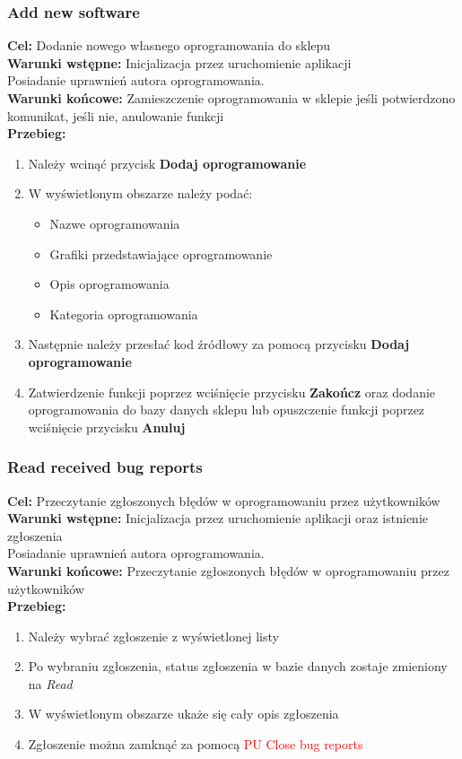 \documentclass[12pt,a4paper]{article}
\begin{document}
\subsubsection{Add new software}
\textbf{Cel: } Dodanie nowego własnego oprogramowania do sklepu \\
\textbf{Warunki wstępne:} Inicjalizacja przez uruchomienie aplikacji \\ Posiadanie uprawnień autora oprogramowania.\\
\textbf{Warunki końcowe:} Zamieszczenie oprogramowania w sklepie jeśli potwierdzono komunikat, jeśli nie, anulowanie funkcji\\
\textbf{Przebieg:}
\begin{enumerate}
    \item Należy wcinąć przycisk \textbf{Dodaj oprogramowanie}
    \item W wyświetlonym obszarze należy podać:
    \begin{itemize}
        \item Nazwe oprogramowania
        \item Grafiki przedstawiające oprogramowanie
        \item Opis oprogramowania
        \item Kategoria oprogramowania
    \end{itemize}
    \item Następnie należy przesłać kod źródłowy za pomocą przycisku  \textbf{Dodaj oprogramowanie}
    \item Zatwierdzenie funkcji poprzez wciśnięcie przycisku \textbf{Zakończ} oraz dodanie oprogramowania do bazy danych sklepu lub opuszczenie funkcji poprzez wciśnięcie przycisku \textbf{Anuluj}
\end{enumerate}

\subsubsection{Read received bug reports}
\textbf{Cel: } Przeczytanie zgłoszonych błędów w oprogramowaniu przez użytkowników \\
\textbf{Warunki wstępne:} Inicjalizacja przez uruchomienie aplikacji oraz istnienie zgłoszenia\\ Posiadanie uprawnień autora oprogramowania.\\
\textbf{Warunki końcowe:} Przeczytanie zgłoszonych błędów w oprogramowaniu przez użytkowników\\
\textbf{Przebieg:}
\begin{enumerate}
    \item Należy wybrać zgłoszenie z wyświetlonej listy
    \item Po wybraniu zgłoszenia, status zgłoszenia w bazie danych zostaje zmieniony na \textit{Read} 
    \item W wyświetlonym obszarze ukaże się cały opis zgłoszenia
    \item Zgłoszenie można zamknąć za pomocą \textcolor{red}{PU Close bug reports}
\end{enumerate}
\end{document}
